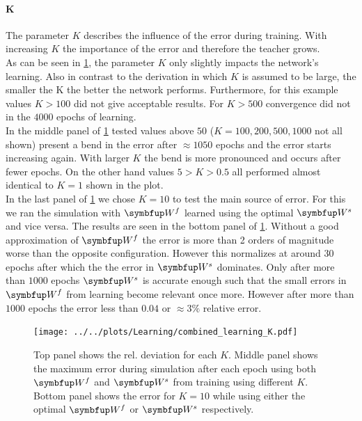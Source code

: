\paragraph{K}
The parameter $K$ describes the influence of the error during training. With increasing $K$ the importance of the error and therefore the teacher grows.\\
As can be seen in \cref{fig:combined_learning_K}, the parameter $K$ only slightly impacts the network's learning. Also in contrast to the derivation in which $K$ is assumed to be large, the smaller the K the better the network performs. Furthermore, for this example values $K>100$ did not give acceptable results. For $K>500$ convergence did not in the $4000$ epochs of learning.\\
In the middle panel of \cref{fig:combined_learning_K} tested values above $50$ ($K = 100, 200,500,1000$ not all shown) present a bend in the error after $\approx 1050$ epochs and the error starts increasing again. With larger $K$ the bend is more pronounced and occurs after fewer epochs.
On the other hand values $5>K>0.5$ all performed almost identical to $K=1$ shown in the plot.\\
In the last panel of \cref{fig:combined_learning_K} we chose $K=10$ to test the main source of error. For this we ran the simulation with $\bmu{W}^f$ learned using the optimal $\bmu{W}^s$ and vice versa. The results are seen in the bottom panel of \cref{fig:combined_learning_K}. Without a good approximation of $\bmu{W}^f$ the error is more than 2 orders of magnitude worse than the opposite configuration. However this normalizes at around $30$ epochs after which the the error in $\bmu{W}^s$ dominates. Only after more than $1000$ epochs $\bmu{W}^s$ is accurate enough such that the small errors in $\bmu{W}^f$ from learning become relevant once more. However after more than $1000$ epochs the error less than $0.04$ or $\approx 3\%$ relative error.\\
\begin{figure}
	\centering
	\texttt{[image: ../../plots/Learning/combined\_learning\_K.pdf]}
	\caption{Top panel shows the rel. deviation for each $K$. Middle panel shows the maximum error during simulation after each epoch using both $\bmu{W}^f$ and $\bmu{W}^s$ from training using different $K$. Bottom panel shows the error for $K = 10$ while using either the optimal $\bmu{W}^f$ or $\bmu{W}^s$ respectively.}
	\label{fig:combined_learning_K}
\end{figure}

